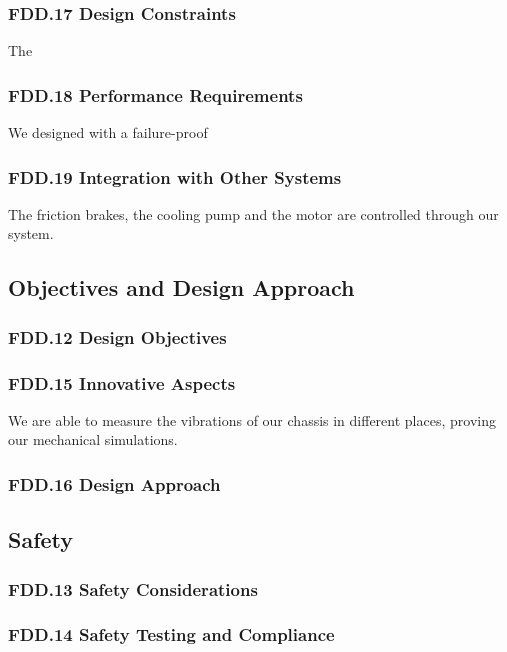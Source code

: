 \subsubsection{FDD.17 Design Constraints}
The
 
\subsubsection{FDD.18 Performance Requirements}
We designed with a failure-proof 
 
\subsubsection{FDD.19 Integration with Other Systems}
The friction brakes, the cooling pump and the motor are controlled through our system.
 
\subsection{Objectives and Design Approach}
\subsubsection{FDD.12 Design Objectives}
 
\subsubsection{FDD.15 Innovative Aspects}
\par We are able to measure the vibrations of our chassis in different places, proving our mechanical simulations.
\subsubsection{FDD.16 Design Approach}
 
\subsection{Safety}
\subsubsection{FDD.13 Safety Considerations}
 
\subsubsection{FDD.14 Safety Testing and Compliance}
 
